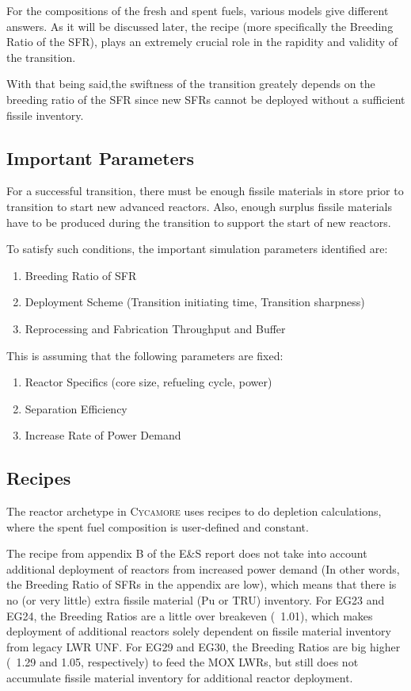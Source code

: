 \documentclass{article}
\newcommand{\Cycamore}{\textsc{Cycamore}\xspace}%
\begin{document}
For the compositions of the fresh and spent fuels, various models give different answers.
As it will be discussed later, the recipe (more specifically the Breeding Ratio of the \gls{SFR}),
plays an extremely crucial role in the rapidity and validity of the transition. 

With that being said,the swiftness of the transition greately depends on the 
breeding ratio of the \gls{SFR} since new \glspl{SFR} cannot be deployed 
without a sufficient fissile inventory. 

\subsection{Important Parameters}
For a successful transition, there must be enough fissile materials in store prior to transition
to start new advanced reactors. Also, enough surplus fissile materials have to be produced
during the transition to support the start of new reactors.

To satisfy such conditions, the important simulation parameters identified are:
\begin{enumerate}
	\item Breeding Ratio of \gls{SFR}
	\item Deployment Scheme (Transition initiating time, Transition sharpness)
	\item Reprocessing and Fabrication Throughput and Buffer
\end{enumerate}


This is assuming that the following parameters are fixed:
\begin{enumerate}
	\item Reactor Specifics (core size, refueling cycle, power)
	\item Separation Efficiency
	\item Increase Rate of Power Demand
\end{enumerate}

\subsection{Recipes}
The reactor archetype in \Cycamore uses recipes to do depletion calculations,
where the spent fuel composition is user-defined and constant. 

The recipe from appendix B of the E\&S report does not take into account
additional deployment of reactors from increased power demand (In other words, the Breeding Ratio
of \glspl{SFR} in the appendix are low), which means that there is no (or very little)
extra fissile material (Pu or TRU) inventory. For EG23 and EG24, the Breeding Ratios are
a little over breakeven (~1.01), which makes deployment of additional reactors solely 
dependent on fissile material inventory from legacy LWR \gls{UNF}. For EG29 and EG30,
the Breeding Ratios are big higher (~1.29 and 1.05, respectively) to feed the
\gls{MOX} \glspl{LWR}, but still does not accumulate fissile material inventory for
additional reactor deployment.
\end{document}
